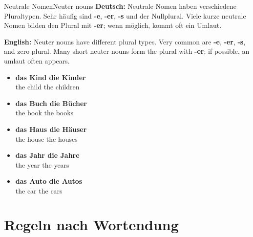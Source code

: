 \documentclass[a4paper,11pt]{article}
\newcommand{\GermanText}[1]{\textbf{Deutsch: }#1\par}
\newcommand{\EnglishText}[1]{{\small\color{SoftGray}\textbf{English: }#1\par}}
\newcommand{\ExampleItem}[2]{\item \textbf{#1}\\{\small\color{SoftGray}#2}}
\begin{document}
\begin{grammarentry}{Neutrale Nomen}{Neuter nouns}
\GermanText{Neutrale Nomen haben verschiedene Pluraltypen. Sehr häufig sind \textbf{-e}, \textbf{-er}, \textbf{-s} und der Nullplural. Viele kurze neutrale Nomen bilden den Plural mit \textbf{-er}; wenn möglich, kommt oft ein Umlaut.}
\EnglishText{Neuter nouns have different plural types. Very common are \textbf{-e}, \textbf{-er}, \textbf{-s}, and zero plural. Many short neuter nouns form the plural with \textbf{-er}; if possible, an umlaut often appears.}
\begin{exbox}
\begin{itemize}
\ExampleItem{das Kind \textrightarrow{} die Kinder}{the child \textrightarrow{} the children}
\ExampleItem{das Buch \textrightarrow{} die Bücher}{the book \textrightarrow{} the books}
\ExampleItem{das Haus \textrightarrow{} die Häuser}{the house \textrightarrow{} the houses}
\ExampleItem{das Jahr \textrightarrow{} die Jahre}{the year \textrightarrow{} the years}
\ExampleItem{das Auto \textrightarrow{} die Autos}{the car \textrightarrow{} the cars}
\end{itemize}
\end{exbox}
\end{grammarentry}

\section{Regeln nach Wortendung}
\end{document}
